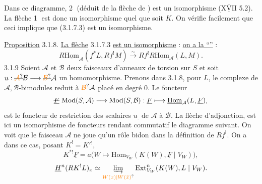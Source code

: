 Dans ce diagramme, \textcircled{\scriptsize 2} (déduit de la flèche de ) est un isomorphisme ($\overline{\underline{\mathrm{XVII}}}$ 5.2). La flèche \textcircled{\scriptsize 1} est donc un isomorphisme quel que soit $K$. On vérifie facilement que ceci implique que (3.1.7.3) est un isomorphisme. 

\uline{Proposition} 3.1.8. \uline{La flèche} 3.1.7.3 \uline{est un isomorphisme} : \uline{on a la ``''} :
\[
 R\underline{\mathrm{Hom}}_{\mathcal A}(f^*L,Rf^!M)
 \xrightarrow{\sim} Rf^!R\mathrm{Hom}_{\mathcal A}(L,M).
\]
3.1.9 Soient $\mathcal A$ et $\mathcal B$  deux faisceaux d'anneaux de torsion sur $S$ et soit $u:\deleted{\unsure{\mathcal A}}\mathcal B\longrightarrow\deleted{\unsure{\mathcal B}}\mathcal A$ un homomorphisme. Prenons dans 3.1.8, pour $L$, le complexe de $\mathcal A,\mathcal B$-bimodules  reduit à $\deleted{\unsure{\mathcal B}}\mathcal A$ placé en degré 0. Le foncteur
\[
 \deleted{\underline F}\ \mathrm{Mod}(S,\mathcal A)\longrightarrow\mathrm{Mod}(S,\mathcal B):
 \underline F\longmapsto\underline{\mathrm{Hom}}_{\mathcal A}(L,\underline F),
\]
est le foncteur de restriction des scalaires $u_{.}$ de $\mathcal A$ à $\mathcal B$. La flèche d'adjonction, est ici un isomorphisme de foncteurs rendant commutatif le diagramme suivant.
On voit que le faisceau $\mathcal A$ ne joue qu'un rôle bidon dans la définition de $Rf^!$.
 
On a dans ce cas, posant $K^!=K'{}^!$,
\[
 K^{* !}\underline F=a\bigl(W\longmapsto\mathrm{Hom}_{V_W}(K(W),\underline F\mid V_W)\bigr),
\]
\[
 \underline H^n(RK^!L)_x\simeq\underset{\unsure{W(x)|W(\bar x)}}{\underrightarrow{\lim}}\,
 \mathrm{Ext}^n_{V_W}(K(W),L\mid V_W).
\]

